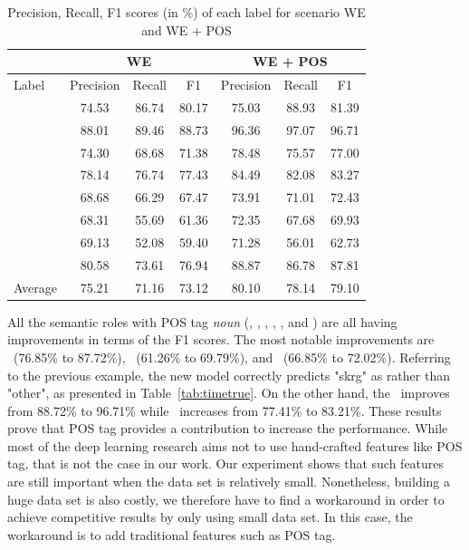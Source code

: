 \begin{table}
	\centering
	\caption{Precision, Recall, F1 scores (in \%) of each label for scenario WE and WE + POS}
	\label{tab:wevswepos}
	\begin{tabular}{|l|ccc|ccc|}
		\hline
		& \multicolumn{3}{c}{ WE } & \multicolumn{3}{c}{ WE + POS } \\
		\hline
		Label & Precision & Recall & F1 & Precision & Recall & F1 \\
		\hline\hline
		\agent & 74.53 & 86.74 & 80.17 & 75.03 & 88.93 & 81.39 \\
		\predicate & 88.01 & 89.46 & 88.73 & 96.36 & 97.07 & 96.71 \\
		\patient & 74.30 & 68.68 & 71.38 & 78.48 & 75.57 & 77.00 \\
		\modal & 78.14 & 76.74 & 77.43 & 84.49 & 82.08 & 83.27 \\
		\beneficiary & 68.68 & 66.29 & 67.47 & 73.91 & 71.01 & 72.43 \\
		\location & 68.31 & 55.69 & 61.36 & 72.35 & 67.68 & 69.93 \\
		\greet & 69.13 & 52.08 & 59.40 & 71.28 & 56.01 & 62.73 \\
		\timesrl & 80.58 & 73.61 & 76.94 & 88.87 & 86.78 & 87.81 \\
		\hline
		Average & 75.21 & 71.16 & 73.12 & 80.10 & 78.14 & 79.10 \\
		\hline
	\end{tabular}

\end{table}

All the semantic roles with POS tag \textit{noun} (\agent, \patient, \beneficiary, \location, \greet, and \timesrl) are all having improvements in terms of the F1 scores. The most notable improvements are \timesrl~(76.85\% to 87.72\%), \location~(61.26\% to 69.79\%), and \beneficiary~(66.85\% to 72.02\%). Referring to the previous example, the new model correctly predicts "skrg" as \timesrl rather than "other", as presented in Table~\ref{tab:timetrue}. On the other hand, the \predicate~improves from 88.72\% to 96.71\% while \modal~increases from 77.41\% to 83.21\%. These results prove that POS tag provides a contribution to increase the performance. While most of the deep learning research aims not to use hand-crafted features like POS tag, that is not the case in our work. Our experiment shows that such features are still important when the data set is relatively small. Nonetheless, building a huge data set is also costly, we therefore have to find a workaround in order to achieve competitive results by only using small data set. In this case, the workaround is to add traditional features such as POS tag.

